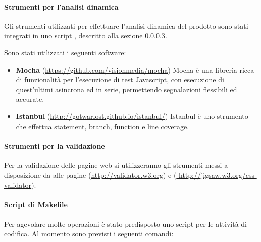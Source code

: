		\paragraph{Strumenti per l'analisi dinamica} 
		Gli strumenti utilizzati per effettuare l'analisi dinamica del prodotto sono stati
	integrati in uno script , descritto alla sezione \ref{makefile-codifica}.
		
		Sono stati utilizzati i seguenti software:
		\begin{itemize}
		\item \textbf{Mocha} (\url{https://github.com/visionmedia/mocha}) Mocha è una libreria ricca di funzionalità per l'esecuzione
		di test Javascript, con esecuzione di quest'ultimi asincrona ed in serie, permettendo segnalazioni flessibili ed accurate.
		\item \textbf{Istanbul} (\url{http://gotwarlost.github.io/istanbul/}) Istanbul è uno strumento che effettua statement, branch, function e line coverage.
		\end{itemize}
		
		\paragraph{Strumenti per la validazione}
		
		Per la validazione delle pagine web si utilizzeranno gli strumenti messi a disposizione da  alle pagine 
		 (\url{http://validator.w3.org}) e (\url{ http://jigsaw.w3.org/css-validator}).			
		
		\paragraph{Script di Makefile}
		\label{makefile-codifica}

Per agevolare molte operazioni è stato predisposto uno script  per le attività di codifica. Al momento sono previsti i seguenti comandi:

